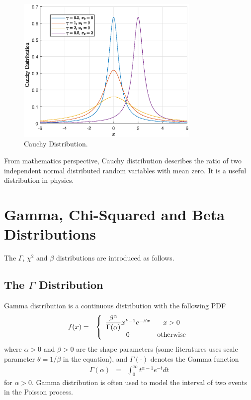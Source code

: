 \begin{figure}
	\centering
	\includegraphics[width=250pt]{chapters/ch-commonly-seen-distributions/figs/cauchy_pdf.eps}
	\caption{Cauchy Distribution.} \label{fig:cauchy_pdf}
\end{figure}

From mathematics perspective, Cauchy distribution describes the ratio of two independent normal distributed random variables with mean zero. It is a useful distribution in physics.

\section{Gamma, Chi-Squared and Beta Distributions}

The $\Gamma$, $\chi^2$ and $\beta$ distributions are introduced as follows.

\subsection{The $\Gamma$ Distribution}

Gamma distribution is a continuous distribution with the following PDF
\begin{eqnarray}
  f(x) &=& \left\{\begin{array}{cc}
                    \dfrac{\beta^\alpha}{\Gamma(\alpha)}x^{k-1}e^{-\beta x} & x > 0 \\
                    0 & \textup{otherwise}
                  \end{array}\right. \label{eq:gammapdf}
\end{eqnarray}
where $\alpha>0$ and $\beta>0$ are the shape parameters (some literatures uses scale parameter $\theta = 1/\beta$ in the equation), and $\Gamma(\cdot)$ denotes the Gamma function
\begin{eqnarray}
  \Gamma(\alpha) &=& \int_{0}^{\infty}t^{\alpha-1}e^{-t}dt \nonumber
\end{eqnarray}
for $\alpha > 0$. Gamma distribution is often used to model the interval of two events in the Poisson process.

